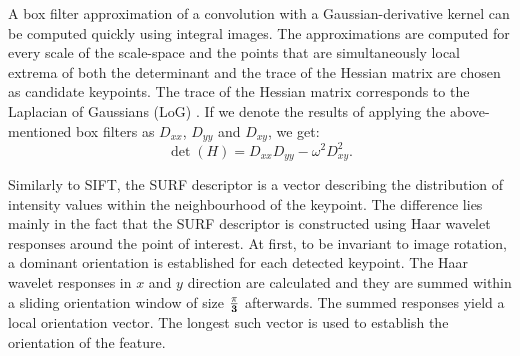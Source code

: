 A box filter approximation of a convolution with a Gaussian-derivative kernel can be computed quickly using integral images. 
The approximations are computed for every scale of the scale-space and 
the points that are simultaneously local extrema of both the determinant and the trace of the Hessian matrix are chosen as candidate keypoints. 
The trace of the Hessian matrix corresponds to the Laplacian of Gaussians (LoG) .
If we denote the results of applying the above-mentioned box filters as $D_{xx}$, $D_{yy}$ and $D_{xy}$, we get: 
\[
\det(H) = D_{xx} D_{yy} - \omega^{2} D_{xy}^{2}.
\]

Similarly to SIFT, the SURF descriptor is a vector describing the distribution of intensity values within the neighbourhood of the keypoint. 
The difference lies mainly in the fact that the SURF descriptor is constructed using Haar wavelet responses around the point of interest. %
At first, to be invariant to image rotation, a dominant orientation is established for each detected keypoint. 
The Haar wavelet responses in $x$ and $y$ direction are calculated 
and they are summed within a sliding orientation window of size $\mathbf{\frac{\pi}{3}}$ afterwards. 
The summed responses yield a local orientation vector. 
The longest such vector is used to establish the orientation of the feature. 

